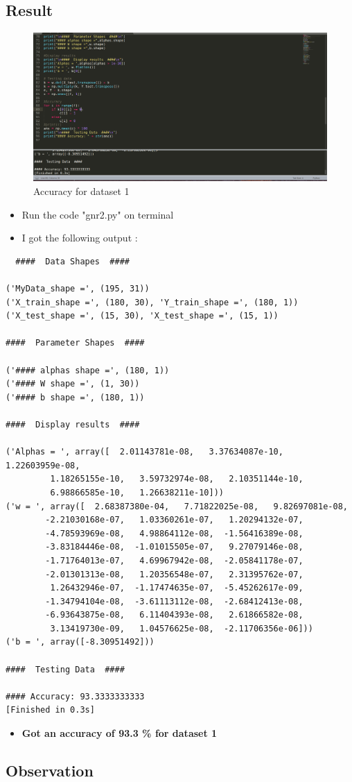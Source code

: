 \documentclass[12pt]{article}
\begin{document}
\subsection{Result}
\begin{figure}[H]
   \includegraphics[width=1.5\textwidth]{set1.png}
    \caption{Accuracy for dataset 1}
\end{figure}
\begin{itemize}
    \item Run the code "gnr2.py" on terminal 
    \item I got the following output :
\end{itemize}
\begin{verbatim}
  ####  Data Shapes  ####

('MyData_shape =', (195, 31))
('X_train_shape =', (180, 30), 'Y_train_shape =', (180, 1))
('X_test_shape =', (15, 30), 'X_test_shape =', (15, 1))

####  Parameter Shapes  ####

('#### alphas shape =', (180, 1))
('#### W shape =', (1, 30))
('#### b shape =', (180, 1))

####  Display results  ####

('Alphas = ', array([  2.01143781e-08,   3.37634087e-10,   1.22603959e-08,
         1.18265155e-10,   3.59732974e-08,   2.10351144e-10,
         6.98866585e-10,   1.26638211e-10]))
('w = ', array([  2.68387380e-04,   7.71822025e-08,   9.82697081e-08,
        -2.21030168e-07,   1.03360261e-07,   1.20294132e-07,
        -4.78593969e-08,   4.98864112e-08,  -1.56416389e-08,
        -3.83184446e-08,  -1.01015505e-07,   9.27079146e-08,
        -1.71764013e-07,   4.69967942e-08,  -2.05841178e-07,
        -2.01301313e-08,   1.20356548e-07,   2.31395762e-07,
         1.26432946e-07,  -1.17474635e-07,  -5.45262617e-09,
        -1.34794104e-08,  -3.61113112e-08,  -2.68412413e-08,
        -6.93643875e-08,   6.11404393e-08,   2.61866582e-08,
         3.13419730e-09,   1.04576625e-08,  -2.11706356e-06]))
('b = ', array([-8.30951492]))

####  Testing Data  ####

#### Accuracy: 93.3333333333
[Finished in 0.3s]  
\end{verbatim}

\begin{itemize}
    \item \textbf{ Got an accuracy of 93.3 \% for dataset 1 }
\end{itemize}
\subsection{Observation}


 
\end{document}
